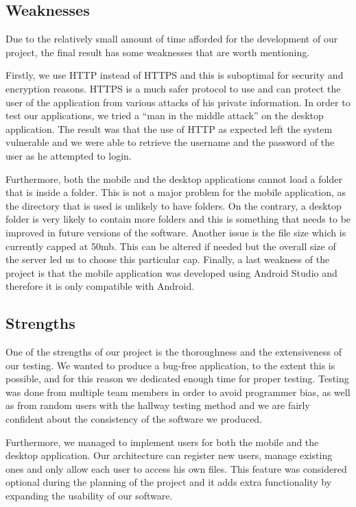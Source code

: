 \documentclass[11pt]{article}
\begin{document}
\subsection{Weaknesses}

Due to the relatively small amount of time afforded for the development of our project, the final result has some weaknesses that are worth mentioning.

Firstly, we use HTTP instead of HTTPS and this is suboptimal for security and encryption reasons. HTTPS is a much safer protocol to use and can protect the user of the application from various attacks of his private information. In order to test our applications, we tried a “man in the middle attack” \cite{callegati:09} on the desktop application. The result was that the use of HTTP as expected left the system vulnerable and we were able to retrieve the username and the password of the user as he attempted to login.  

Furthermore, both the mobile and the desktop applications cannot load a folder that is inside a folder. This is not a major problem for the mobile application, as the directory that is used is unlikely to have folders. On the contrary, a desktop folder is very likely to contain more folders and this is something that needs to be improved in future versions of the software. Another issue is the file size which is currently capped at 50mb. This can be altered if needed but the overall size of the server led us to choose this particular cap. Finally, a last weakness of the project is that the mobile application was developed using Android Studio and therefore it is only compatible with Android.

\subsection{Strengths}

One of the strengths of our project is the thoroughness and the extensiveness of our testing. We wanted to produce a bug-free application, to the extent this is possible, and for this reason we dedicated enough time for proper testing. Testing was done from multiple team members in order to avoid programmer bias, as well as from random users with the hallway testing method and we are fairly confident about the consistency of the software we produced.

Furthermore, we managed to implement users for both the mobile and the desktop application. Our architecture can register new users, manage existing ones and only allow each user to access his own files. This feature was considered optional during the planning of the project and it adds extra functionality by expanding the usability of our software.
\end{document}
